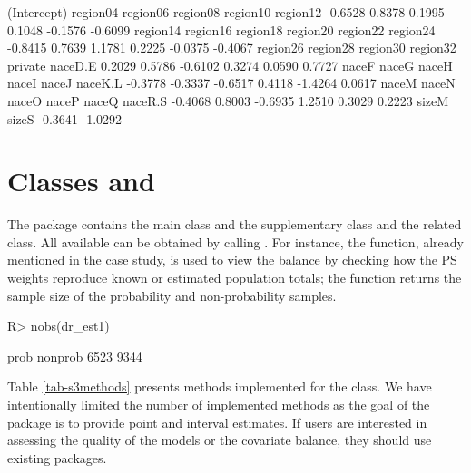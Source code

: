 \documentclass[
]{jss}
\begin{document}
\begin{CodeChunk}
\begin{CodeOutput}
(Intercept)    region04    region06    region08    region10    region12 
    -0.6528      0.8378      0.1995      0.1048     -0.1576     -0.6099 
   region14    region16    region18    region20    region22    region24 
    -0.8415      0.7639      1.1781      0.2225     -0.0375     -0.4067 
   region26    region28    region30    region32     private     naceD.E 
     0.2029      0.5786     -0.6102      0.3274      0.0590      0.7727 
      naceF       naceG       naceH       naceI       naceJ     naceK.L 
    -0.3778     -0.3337     -0.6517      0.4118     -1.4264      0.0617 
      naceM       naceN       naceO       naceP       naceQ     naceR.S 
    -0.4068      0.8003     -0.6935      1.2510      0.3029      0.2223 
      sizeM       sizeS 
    -0.3641     -1.0292 
\end{CodeOutput}
\end{CodeChunk}

\section[Classes and S3Methods]{Classes and }\label{sec-s3methods}

The package contains the main class  and the supplementary
class  and the related 
class. All available  can be obtained by calling
. For instance, the
 function, already mentioned in the case study, is
used to view the balance by checking how the PS weights reproduce known
or estimated population totals; the  function returns the
sample size of the probability and non-probability samples.

\begin{CodeChunk}
\begin{CodeInput}
R> nobs(dr_est1)
\end{CodeInput}
\begin{CodeOutput}
   prob nonprob 
   6523    9344 
\end{CodeOutput}
\end{CodeChunk}

Table \ref{tab-s3methods} presents methods implemented for the
 class. We have intentionally limited the number of
implemented methods as the goal of the package is to provide point and
interval estimates. If users are interested in assessing the quality of
the models or the covariate balance, they should use existing
 packages.
\end{document}

